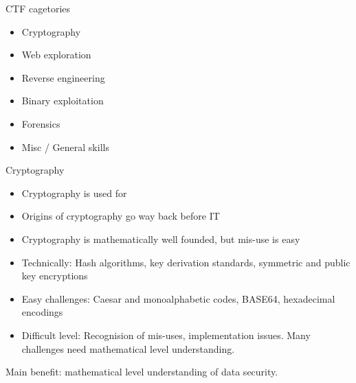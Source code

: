\documentclass[12 pt]{beamer}
\begin{document}

\begin{frame}{CTF cagetories}

    \begin{itemize}
      \item{Cryptography}

      \bigskip

      \item{Web exploration}

      \bigskip

      \item{Reverse engineering}

      \bigskip

      \item{Binary exploitation}

      \bigskip

      \item{Forensics}

      \bigskip

      \item{Misc / General skills}
    \end{itemize}

\end{frame}


\begin{frame}{Cryptography}

  \begin{itemize}
    \item{Cryptography is used for }
    \item{Origins of cryptography go way back before IT}
    \item{Cryptography is mathematically well founded, but mis-use is easy}
    \item{Technically: Hash algorithms, key derivation standards, symmetric and public key encryptions}
    \item{Easy challenges: Caesar and monoalphabetic codes, BASE64, hexadecimal encodings}
    \item{Difficult level: Recognision of mis-uses, implementation issues. Many challenges need mathematical level understanding.}
  \end{itemize}

  \begin{exampleblock}{}
    Main benefit: mathematical level understanding of data security.
  \end{exampleblock}

\end{frame}
\end{document}
